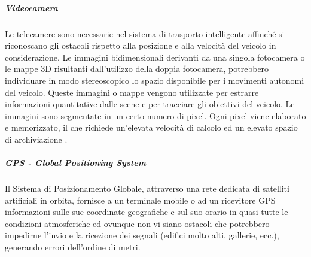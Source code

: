 \documentclass[14pt]{extarticle}
\begin{document}

\subparagraph{Videocamera}
Le telecamere sono necessarie nel sistema di trasporto intelligente affinché si riconoscano gli ostacoli rispetto alla posizione e alla velocità del
veicolo in considerazione. Le immagini bidimensionali derivanti da una
singola fotocamera o le mappe 3D risultanti dall'utilizzo della doppia
fotocamera, potrebbero individuare in modo stereoscopico lo spazio disponibile per i movimenti autonomi del veicolo. Queste immagini o mappe
vengono utilizzate per estrarre informazioni quantitative dalle scene e
per tracciare gli obiettivi del veicolo. Le immagini sono segmentate in un
certo numero di pixel. Ogni pixel viene elaborato e memorizzato, il che richiede un'elevata velocità di calcolo ed un elevato spazio di archiviazione
\cite{das2018risk}.

\subparagraph{GPS - Global Positioning System}
Il Sistema di Posizionamento Globale, attraverso una rete dedicata di satelliti artificiali in orbita, fornisce a un terminale mobile o ad un ricevitore
GPS informazioni sulle sue coordinate geografiche e sul suo orario in
quasi tutte le condizioni atmosferiche ed ovunque non vi siano ostacoli
che potrebbero impedirne l'invio e la ricezione dei segnali (edifici molto
alti, gallerie, ecc.), generando errori dell'ordine di metri.
\end{document}

